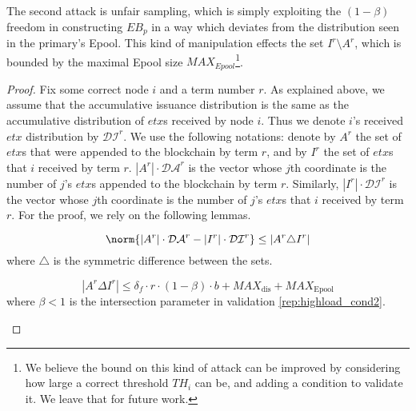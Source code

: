 The second attack is unfair sampling, which is simply exploiting the $(1-\beta)$ freedom in constructing $EB_p$ in a way which deviates from the distribution seen in the primary's Epool. This kind of manipulation effects the set $I^r\setminus A^r$, which is bounded by the maximal Epool size $MAX_{Epool}$\footnote{We believe the bound on this kind of attack can be improved by considering how large a correct threshold $TH_i$ can be, and adding a condition to validate it. We leave that for future work.}.


\begin{proof}
Fix some correct node $i$ and a term number $r$. As explained above, we assume that the accumulative issuance distribution is the same as the accumulative distribution of $etx$s received by node $i$. Thus we denote $i$'s received $etx$ distribution by $\mathcal{DI}^r$. We use the following notations: denote by $A^r$ the set of $etx$s that were appended to the blockchain by term $r$, and by $I^{r}$ the set of $etx$s that $i$ received by term $r$. $|A^r|\cdot \mathcal{DA}^r$ is the vector whose $j$th coordinate is the number of $j$'s $etx$s appended to the blockchain by term $r$. Similarly, $|I^r|\cdot \mathcal{DI}^{r}$ is the vector whose $j$th coordinate is the number of $j$'s $etx$s that $i$ received by term $r$. 
For the proof, we rely on the following lemmas.

\begin{lemma} \label{lemma:rep_symetric}
\begin{equation} \label{eq:rep_symetric}
\norm{|A^r|\cdot \mathcal{DA}^r-|I^{r}|\cdot\mathcal{DI}^{r}}\leq \left | A^r \triangle I^{r} \right | 
\end{equation}
where $\triangle$ is the symmetric difference between the sets. 
\end{lemma}
\begin{lemma} \label{lemma:rep_AminusI} 
 \begin{equation}|A^r\Delta I^r |\leq \delta_f\cdot r \cdot (1-\beta)\cdot b+MAX_\text{dis}+MAX_\text{Epool}
 \end{equation}
 where $\beta<1$ is the intersection parameter in validation \ref{rep:highload_cond2}.
\end{lemma}


\end{proof}
